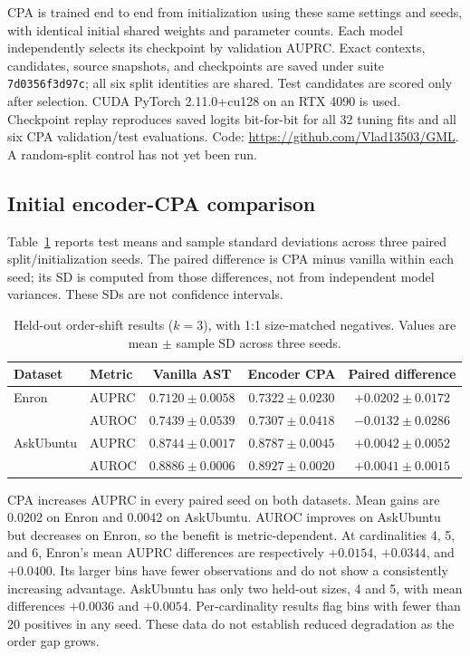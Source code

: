 \documentclass{article}
\begin{document}
CPA is trained end to end from initialization using these same settings and seeds, with identical initial shared weights and parameter counts. Each model independently selects its checkpoint by validation AUPRC. Exact contexts, candidates, source snapshots, and checkpoints are saved under suite \texttt{7d0356f3d97c}; all six split identities are shared. Test candidates are scored only after selection. CUDA PyTorch 2.11.0+cu128 on an RTX 4090 is used. Checkpoint replay reproduces saved logits bit-for-bit for all 32 tuning fits and all six CPA validation/test evaluations. Code: \url{https://github.com/Vlad13503/GML}. A random-split control has not yet been run.

\subsection{Initial encoder-CPA comparison}
Table~\ref{tab:initial} reports test means and sample standard deviations across three paired split/initialization seeds. The paired difference is CPA minus vanilla within each seed; its SD is computed from those differences, not from independent model variances. These SDs are not confidence intervals.

\begin{table}[t]
\centering
\caption{Held-out order-shift results ($k=3$), with 1:1 size-matched negatives. Values are mean $\pm$ sample SD across three seeds.}
\label{tab:initial}
\small
\begin{tabular}{llccc}
\toprule
Dataset & Metric & Vanilla AST & Encoder CPA & Paired difference \\
\midrule
Enron & AUPRC & $0.7120\pm0.0058$ & $0.7322\pm0.0230$ & $+0.0202\pm0.0172$ \\
      & AUROC & $0.7439\pm0.0539$ & $0.7307\pm0.0418$ & $-0.0132\pm0.0286$ \\
AskUbuntu & AUPRC & $0.8744\pm0.0017$ & $0.8787\pm0.0045$ & $+0.0042\pm0.0052$ \\
          & AUROC & $0.8886\pm0.0006$ & $0.8927\pm0.0020$ & $+0.0041\pm0.0015$ \\
\bottomrule
\end{tabular}
\end{table}

CPA increases AUPRC in every paired seed on both datasets. Mean gains are 0.0202 on Enron and 0.0042 on AskUbuntu. AUROC improves on AskUbuntu but decreases on Enron, so the benefit is metric-dependent. At cardinalities 4, 5, and 6, Enron's mean AUPRC differences are respectively $+0.0154$, $+0.0344$, and $+0.0400$. Its larger bins have fewer observations and do not show a consistently increasing advantage. AskUbuntu has only two held-out sizes, 4 and 5, with mean differences $+0.0036$ and $+0.0054$. Per-cardinality results flag bins with fewer than 20 positives in any seed. These data do not establish reduced degradation as the order gap grows.
\end{document}
